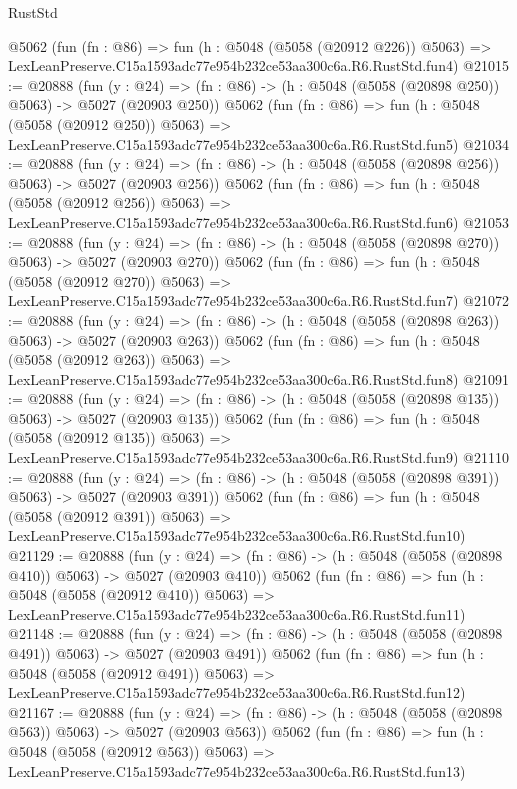 \begin{lexlean}{RustStd}
\begin{coremodule}
    @5062
    (fun (fn : @86) =>
    fun (h : @5048 (@5058 (@20912 @226)) @5063) =>
    LexLeanPreserve.C15a1593adc77e954b232ce53aa300c6a.R6.RustStd.fun4)
@21015 := @20888
    (fun (y : @24) => (fn : @86) -> (h : @5048 (@5058 (@20898 @250)) @5063) -> @5027 (@20903 @250))
    @5062
    (fun (fn : @86) =>
    fun (h : @5048 (@5058 (@20912 @250)) @5063) =>
    LexLeanPreserve.C15a1593adc77e954b232ce53aa300c6a.R6.RustStd.fun5)
@21034 := @20888
    (fun (y : @24) => (fn : @86) -> (h : @5048 (@5058 (@20898 @256)) @5063) -> @5027 (@20903 @256))
    @5062
    (fun (fn : @86) =>
    fun (h : @5048 (@5058 (@20912 @256)) @5063) =>
    LexLeanPreserve.C15a1593adc77e954b232ce53aa300c6a.R6.RustStd.fun6)
@21053 := @20888
    (fun (y : @24) => (fn : @86) -> (h : @5048 (@5058 (@20898 @270)) @5063) -> @5027 (@20903 @270))
    @5062
    (fun (fn : @86) =>
    fun (h : @5048 (@5058 (@20912 @270)) @5063) =>
    LexLeanPreserve.C15a1593adc77e954b232ce53aa300c6a.R6.RustStd.fun7)
@21072 := @20888
    (fun (y : @24) => (fn : @86) -> (h : @5048 (@5058 (@20898 @263)) @5063) -> @5027 (@20903 @263))
    @5062
    (fun (fn : @86) =>
    fun (h : @5048 (@5058 (@20912 @263)) @5063) =>
    LexLeanPreserve.C15a1593adc77e954b232ce53aa300c6a.R6.RustStd.fun8)
@21091 := @20888
    (fun (y : @24) => (fn : @86) -> (h : @5048 (@5058 (@20898 @135)) @5063) -> @5027 (@20903 @135))
    @5062
    (fun (fn : @86) =>
    fun (h : @5048 (@5058 (@20912 @135)) @5063) =>
    LexLeanPreserve.C15a1593adc77e954b232ce53aa300c6a.R6.RustStd.fun9)
@21110 := @20888
    (fun (y : @24) => (fn : @86) -> (h : @5048 (@5058 (@20898 @391)) @5063) -> @5027 (@20903 @391))
    @5062
    (fun (fn : @86) =>
    fun (h : @5048 (@5058 (@20912 @391)) @5063) =>
    LexLeanPreserve.C15a1593adc77e954b232ce53aa300c6a.R6.RustStd.fun10)
@21129 := @20888
    (fun (y : @24) => (fn : @86) -> (h : @5048 (@5058 (@20898 @410)) @5063) -> @5027 (@20903 @410))
    @5062
    (fun (fn : @86) =>
    fun (h : @5048 (@5058 (@20912 @410)) @5063) =>
    LexLeanPreserve.C15a1593adc77e954b232ce53aa300c6a.R6.RustStd.fun11)
@21148 := @20888
    (fun (y : @24) => (fn : @86) -> (h : @5048 (@5058 (@20898 @491)) @5063) -> @5027 (@20903 @491))
    @5062
    (fun (fn : @86) =>
    fun (h : @5048 (@5058 (@20912 @491)) @5063) =>
    LexLeanPreserve.C15a1593adc77e954b232ce53aa300c6a.R6.RustStd.fun12)
@21167 := @20888
    (fun (y : @24) => (fn : @86) -> (h : @5048 (@5058 (@20898 @563)) @5063) -> @5027 (@20903 @563))
    @5062
    (fun (fn : @86) =>
    fun (h : @5048 (@5058 (@20912 @563)) @5063) =>
    LexLeanPreserve.C15a1593adc77e954b232ce53aa300c6a.R6.RustStd.fun13)

\end{coremodule}
\end{lexlean}
